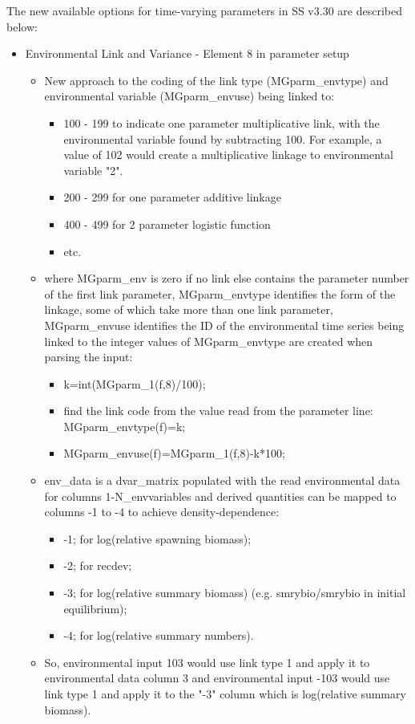 The new available options for time-varying parameters in SS v3.30 are described below:
\begin{itemize}
	\item Environmental Link and  Variance - Element 8 in parameter setup
		\begin{itemize}
			\item New approach to the coding of the link type (MGparm\_envtype) and environmental variable (MGparm\_envuse) being linked to: %
			\begin{itemize}
				\item 100 - 199  to indicate one parameter multiplicative link, with the environmental variable found by subtracting 100.  For example, a value of 102 would create a multiplicative linkage to environmental variable "2". %
				\item 200 - 299  for one parameter additive linkage %
				\item 400 - 499  for  2 parameter logistic function %
				\item etc. %
			\end{itemize}
			\item where MGparm\_env is zero if no link else contains the parameter number of the first link parameter, MGparm\_envtype identifies the form of the linkage, some of which take more than one link parameter, MGparm\_envuse identifies the ID of the environmental time series being linked to the integer values of MGparm\_envtype are created when parsing the input:
			\begin{itemize}
				\item k=int(MGparm\_1(f,8)/100); 
				\item find the link code from the value read from the parameter line: MGparm\_envtype(f)=k;
				\item MGparm\_envuse(f)=MGparm\_1(f,8)-k*100;
			\end{itemize}
			\item env\_data is a dvar\_matrix populated with the read environmental data for columns 1-N\_envvariables and derived quantities can be mapped to columns -1 to -4 to achieve density-dependence:
			\begin{itemize}
				\item -1;  for log(relative spawning biomass);
				\item -2;  for recdev;
				\item -3;  for log(relative summary biomass) (e.g. smrybio/smrybio in initial equilibrium);
				\item -4;  for log(relative summary numbers).
			\end{itemize}
			\item So, environmental input 103 would use link type 1 and apply it to environmental data column 3 and environmental input -103  would use link type 1 and apply it to the "-3" column which is log(relative summary biomass).
		\end{itemize}
		

\end{itemize}
